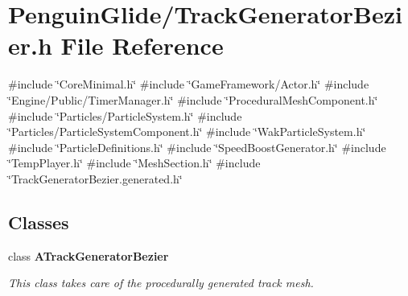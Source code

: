 \section{Penguin\+Glide/\+Track\+Generator\+Bezier.h File Reference}
\label{_track_generator_bezier_8h}
{\ttfamily \#include \char`\"{}Core\+Minimal.\+h\char`\"{}}\newline
{\ttfamily \#include \char`\"{}Game\+Framework/\+Actor.\+h\char`\"{}}\newline
{\ttfamily \#include \char`\"{}Engine/\+Public/\+Timer\+Manager.\+h\char`\"{}}\newline
{\ttfamily \#include \char`\"{}Procedural\+Mesh\+Component.\+h\char`\"{}}\newline
{\ttfamily \#include \char`\"{}Particles/\+Particle\+System.\+h\char`\"{}}\newline
{\ttfamily \#include \char`\"{}Particles/\+Particle\+System\+Component.\+h\char`\"{}}\newline
{\ttfamily \#include \char`\"{}Wak\+Particle\+System.\+h\char`\"{}}\newline
{\ttfamily \#include \char`\"{}Particle\+Definitions.\+h\char`\"{}}\newline
{\ttfamily \#include \char`\"{}Speed\+Boost\+Generator.\+h\char`\"{}}\newline
{\ttfamily \#include \char`\"{}Temp\+Player.\+h\char`\"{}}\newline
{\ttfamily \#include \char`\"{}Mesh\+Section.\+h\char`\"{}}\newline
{\ttfamily \#include \char`\"{}Track\+Generator\+Bezier.\+generated.\+h\char`\"{}}\newline
\subsection*{Classes}
\begin{DoxyCompactItemize}
\item 
class \textbf{ A\+Track\+Generator\+Bezier}
\begin{DoxyCompactList}\small\item\em This class takes care of the procedurally generated track mesh. \end{DoxyCompactList}\end{DoxyCompactItemize}
